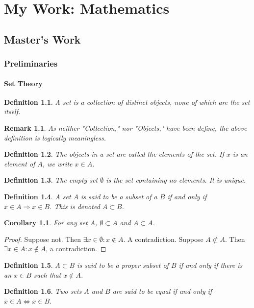 \documentclass[oneside]{book}
\theoremstyle{mystyle}
\newtheorem{definition}{Definition}[section]
\newtheorem{corollary}{Corollary}[section]
\newtheorem{remark}{Remark}[section]
\begin{document}
\part{My Work: Mathematics}
\chapter{Master's Work}
\section{Preliminaries}
\subsection{Set Theory}
\begin{definition}
A set is a collection of distinct objects, none of which are the set itself.
\end{definition}
\begin{remark}
As neither "Collection," nor "Objects," have been define, the above definition is logically meaningless.
\end{remark}
\begin{definition}
The objects in a set are called the elements of the set. If $x$ is an element of $A$, we write $x\in A$.
\end{definition}
\begin{definition}
The empty set $\emptyset$ is the set containing no elements. It is unique.
\end{definition}
\begin{definition}
A set $A$ is said to be a subset of a $B$ if and only if $x\in A\Rightarrow x\in B$. This is denoted $A\subset B$.
\end{definition}
\begin{corollary}
For any set $A$, $\emptyset \subset A$ and $A\subset A$.
\end{corollary}
\begin{proof}
Suppose not. Then $\exists x\in \emptyset: x\notin A$. A contradiction. Suppose $A\not\subset A$. Then $\exists x\in A:x\notin A$, a contradiction.
\end{proof}
\begin{definition}
$A\subset B$ is said to be a proper subset of $B$ if and only if there is an $x\in B$ such that $x\notin A$.
\end{definition}

\begin{definition}
Two sets $A$ and $B$ are said to be equal if and only if $x\in A \Leftrightarrow x\in B$.
\end{definition}
\end{document}
